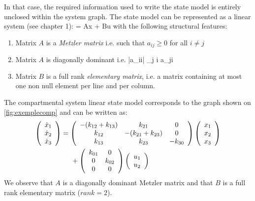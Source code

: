In that case, the required information used to write the state model is entirely unclosed within the system graph.
The state model can be represented as a linear system (see chapter 1):
\eqnn
{} = Ax + Bu
\eeqnn
with the following structural features:
\begin{enumerate}
\item Matrix $A$ is a {\em Metzler matrix} i.e. such that $a_{ij} \geq 0$ for all $i \neq j$
\item Matrix $A$ is diagonally dominant i.e.
\eqnn |a_{ii}| \geq \sum_{j \neq i} a_{ji} 
\eeqnn
\item Matrix $B$ is a full rank {\em elementary matrix}, i.e. a matrix containing at most one non null element per line and per column.
\end{enumerate}

\begin{exemple}
The compartmental system linear state model corresponds to the graph shown on \ref{fig:exemplecomp} 
and can be written as:
\begin{equation} \begin{split}
\bma{c} \dot x_1 \\ \dot x_2 \\ \dot x_3 \ema &= 
\bma{ccc} -(k_{12} + k_{13}) & k_{21} & 0 \\ 
k_{12} & -(k_{21} + k_{23}) & 0 \\ k_{13} & k_{23} & - k_{30} \ema
\bma{c} x_1 \\ x_2 \\ x_3 \ema \\ &\hd
+ \bma{cc} k_{01} & 0 \\ 0 & k_{02} \\ 0 & 0 \ema
\bma{c} u_1 \\ u_2 \ema
\end{split} \end{equation}
We observe that $A$ is a diagonally dominant Metzler matrix and that $B$ is a full rank elementary matrix ($rank = 2$).
\cqfd
\end{exemple}

